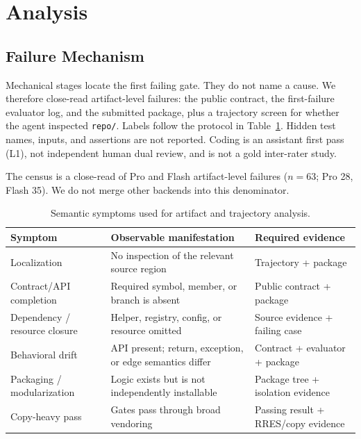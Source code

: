 \section{Analysis}
\label{sec:analysis}

\subsection{Failure Mechanism}
\label{sec:mechanism}

Mechanical stages locate the first failing gate. They do not name a cause.
We therefore close-read artifact-level failures: the public contract, the
first-failure evaluator log, and the submitted package, plus a trajectory
screen for whether the agent inspected \texttt{repo/}. Labels follow the
protocol in Table~\ref{tab:symptoms}. Hidden test names, inputs, and
assertions are not reported. Coding is an assistant first pass (L1), not
independent human dual review, and is not a gold inter-rater study.

The census is a close-read of Pro and Flash artifact-level failures
($n=63$; Pro 28, Flash 35). We do not merge other backends into this
denominator.

\begin{table}[t]
  \caption{Semantic symptoms used for artifact and trajectory analysis.}
  \label{tab:symptoms}
  \centering
  \begin{tabularx}{\textwidth}{@{}p{}Xp{}@{}}
    \toprule
    \textbf{Symptom} & \textbf{Observable manifestation} & \textbf{Required evidence} \\
    \midrule
    Localization & No inspection of the relevant source region
      & Trajectory + package \\
    Contract/API completion & Required symbol, member, or branch is absent
      & Public contract + package \\
    Dependency / resource closure & Helper, registry, config, or resource omitted
      & Source evidence + failing case \\
    Behavioral drift & API present; return, exception, or edge semantics differ
      & Contract + evaluator + package \\
    Packaging / modularization & Logic exists but is not independently installable
      & Package tree + isolation evidence \\
    Copy-heavy pass & Gates pass through broad vendoring
      & Passing result + RRES/copy evidence \\
    \bottomrule
  \end{tabularx}
\end{table}

